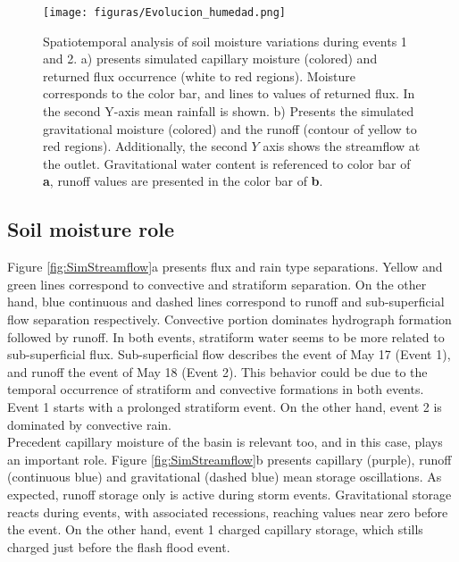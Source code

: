 {\begin{figure}[t!]
\centering
 \texttt{[image: figuras/Evolucion\_humedad.png]}
 \caption{Spatiotemporal analysis of soil moisture variations during events 1 and 2.  a) presents simulated capillary moisture (colored) and returned flux occurrence (white to red regions).  Moisture corresponds to the color bar, and lines to values of returned flux.  In the second Y-axis mean rainfall is shown. b) Presents the simulated gravitational moisture (colored) and the runoff (contour of yellow to red regions).  Additionally, the second $Y$ axis shows the streamflow at the outlet.  Gravitational water content is referenced to color bar of \textbf{a}, runoff values are presented in the color bar of \textbf{b}.}
    \label{fig:HumedadSpatioTemporal}
\end{figure}

\subsection{Soil moisture role}

Figure \ref{fig:SimStreamflow}a presents flux and rain type separations.   Yellow and green lines correspond to convective and stratiform separation.  On the other hand, blue continuous and dashed lines correspond to runoff and sub-superficial flow separation respectively.  Convective portion dominates hydrograph formation followed by runoff.  In both events, stratiform water seems to be more related to sub-superficial flux.  Sub-superficial flow describes the event of May 17 (Event 1), and runoff the event of May 18 (Event 2). This behavior could be due to the temporal occurrence of stratiform and convective formations in both events.  Event 1 starts with a prolonged stratiform event.  On the other hand, event 2 is dominated by convective rain.\\

Precedent capillary moisture of the basin is relevant too, and in this case, plays an important role. Figure \ref{fig:SimStreamflow}b presents capillary (purple), runoff (continuous blue) and gravitational (dashed blue) mean storage oscillations.  As expected, runoff storage only is active during storm events. Gravitational storage reacts during events, with associated recessions, reaching values near zero before the event.  On the other hand, event 1 charged capillary storage, which stills charged just before the flash flood event.\\ 

}
